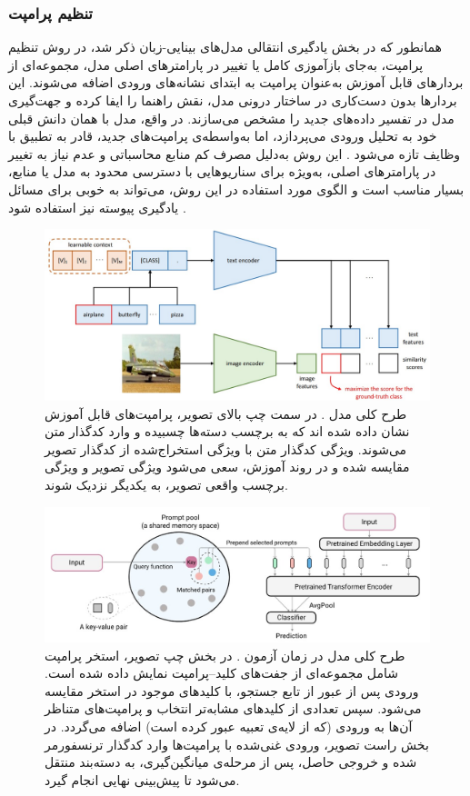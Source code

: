 \subsubsection{تنظیم پرامپت}
همانطور که در بخش یادگیری انتقالی مدل‌های بینایی-زبان ذکر شد، در روش تنظیم پرامپت، به‌جای بازآموزی کامل یا تغییر در پارامتر‌های اصلی مدل، مجموعه‌ای از بردارهای قابل‌ آموزش به‌عنوان پرامپت به ابتدای نشانه‌های ورودی
اضافه می‌شوند. این بردارها بدون دست‌کاری در ساختار درونی مدل، نقش راهنما را ایفا کرده و جهت‌گیری مدل در تفسیر داده‌های جدید را مشخص می‌سازند. در واقع، مدل با همان دانش قبلی خود به تحلیل ورودی می‌پردازد، اما به‌واسطه‌ی پرامپت‌های جدید، قادر به تطبیق با وظایف تازه می‌شود \cite{llm_continual}. این روش به‌دلیل مصرف کم منابع محاسباتی و عدم نیاز به تغییر در پارامتر‌های اصلی، به‌ویژه برای سناریوهایی با دسترسی محدود به مدل یا منابع، بسیار مناسب است و الگوی مورد استفاده در این روش، می‌تواند به خوبی برای مسائل یادگیری پیوسته نیز استفاده شود
\cite{llm_continual}.
\begin{figure}
	\centering\includegraphics[scale=.55]{Images/Chapter2/CoOp.jpg}
	\caption[طرح ‌کلی مدل 
	]{ طرح کلی مدل 
		\protect\cite{CoOp}.
		 در سمت چپ بالای تصویر، پرامپت‌های قابل آموزش نشان داده شده اند که به برچسب دسته‌ها چسبیده و وارد کدگذار متن می‌شوند. ویژگی کدگذار متن با ویژگی استخراج‌شده از کدگذار تصویر مقایسه شده و در روند آموزش، سعی می‌شود ویژگی‌ تصویر و ویژگی برچسب واقعی تصویر، به یکدیگر نزدیک شوند.
		}
	\label{fig.23}
\end{figure}
\begin{figure}
	\centering\includegraphics[scale=.65]{Images/Chapter2/l2p.jpg}
	\caption[طرح کلی مدل 
	]{ طرح کلی مدل 
		در زمان آزمون
		\protect\cite{l2p}.
		در بخش چپ تصویر، استخر پرامپت شامل مجموعه‌ای از جفت‌های کلید–پرامپت نمایش داده شده است. ورودی پس از عبور از تابع جستجو، با کلیدهای موجود در استخر مقایسه می‌شود. سپس تعدادی از کلیدهای مشابه‌تر انتخاب و پرامپت‌های متناظر آن‌ها به ورودی (که از لایه‌ی تعبیه عبور کرده است) اضافه می‌گردد. در بخش راست تصویر، ورودی غنی‌شده با پرامپت‌ها وارد کدگذار ترنسفورمر شده و خروجی حاصل، پس از مرحله‌ی میانگین‌گیری، به دسته‌بند منتقل می‌شود تا پیش‌بینی نهایی انجام گیرد. 		
		}
	\label{fig.24}
\end{figure}

